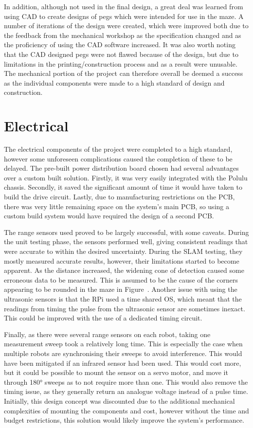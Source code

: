 In addition, although not used in the final design, a great deal was learned from 
using CAD to create designs of pegs which were intended for use in the maze. A number 
of iterations of the design were created, which were  improved  both due to the feedback from the mechanical workshop as the specification changed and as the proficiency of using the CAD software increased. It was also worth noting that the CAD designed pegs were not flawed
because of the design, but due to limitations in the printing/construction process and as a result were unusable. 
The mechanical portion of the project can therefore overall be deemed a success as 
the individual components were made to a high standard of design and construction. 

\section{Electrical}\label{eval/elec}
The electrical components of the project were completed to a high standard, 
however some unforeseen complications caused the completion of these to be delayed. The pre-built power distribution board chosen had several advantages over a 
custom built solution. Firstly, it was very easily integrated with the Polulu 
chassis. Secondly, it saved the significant amount of time it would have taken 
to build the drive circuit. Lastly, due to manufacturing restrictions on the PCB, 
there was very little remaining space on the system's main PCB, so using a custom 
build system would have required the design of a second PCB. 

The range sensors used proved to be largely successful, with some caveats. 
During the unit testing phase, the sensors performed well, giving consistent 
readings that were accurate to within the desired uncertainty. During the SLAM testing, 
they mostly measured accurate results, however, their limitations started to 
become apparent. As the distance increased, the widening cone of detection caused some 
erroneous data to be measured. This is assumed to be the cause of the corners 
appearing to be rounded in the maze in Figure~. Another issue with using the ultrasonic sensors is that the RPi used a time 
shared OS, which meant that the readings from timing the pulse from the 
ultrasonic sensor are sometimes inexact. This could be improved with the use of 
a dedicated timing circuit. 

Finally, as there were several range sensors on each 
robot, taking one measurement sweep took a relatively long time. This is 
especially the case when multiple robots are synchronising their sweeps to avoid 
interference. This would have been mitigated if an infrared sensor had been used. 
This would cost more, but it could be possible to mount the sensor on a servo 
motor, and move it through \ang{180} sweeps as to not require more than one. 
This would also remove the timing issue, as they generally return an analogue 
voltage instead of a pulse time. Initially, this design concept was discounted  due to the additional mechanical complexities of mounting the components and 
cost, however without the time and budget restrictions, this solution would 
likely improve the system's performance. 

